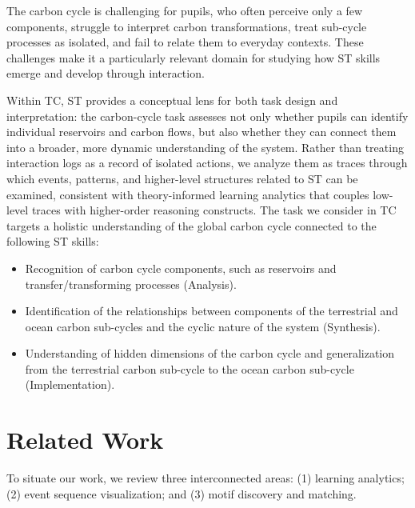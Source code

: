 \documentclass[letterpaper,journal]{IEEEtran}
\begin{document}
The carbon cycle is challenging for pupils, who often perceive only a few components, struggle to interpret carbon transformations, treat sub-cycle processes as isolated, and fail to relate them to everyday contexts. 
These challenges make it a particularly relevant domain for studying how ST skills emerge and develop through interaction.

Within TC, ST provides a conceptual lens for both task design and interpretation: the carbon-cycle task assesses not only whether pupils can identify individual reservoirs and carbon flows, but also whether they can connect them into a broader, more dynamic understanding of the system. 
Rather than treating interaction logs as a record of isolated actions, we analyze them as traces through which events, patterns, and higher-level structures related to ST can be examined, consistent with theory-informed learning analytics that couples low-level traces with higher-order reasoning constructs.
The task we consider in TC targets a holistic understanding of the global carbon cycle connected to the following ST skills:

\begin{itemize}[nosep]
  \item
  Recognition of carbon cycle components, such as reservoirs and transfer/transforming processes (Analysis).
  
  \item 
  Identification of the relationships between components of the terrestrial and ocean carbon sub-cycles and the cyclic nature of the system (Synthesis).
  
  \item 
  Understanding of hidden dimensions of the carbon cycle and generalization from the terrestrial carbon sub-cycle to the ocean carbon sub-cycle (Implementation).
\end{itemize}






\section{Related Work}
\label{sec:related_work}
To situate our work, we review three interconnected areas: (1) learning analytics; (2) event sequence visualization; and (3) motif discovery and matching.
\end{document}
